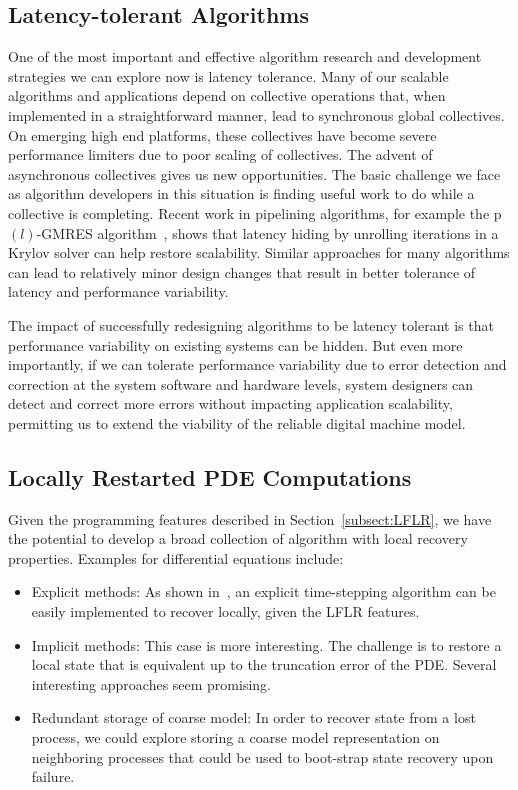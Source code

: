 \documentclass[10pt, twocolumn]{IEEEtran}
\begin{document}
\subsection{Latency-tolerant Algorithms}

One of the most important and effective algorithm research and development strategies we can explore now is latency tolerance.  Many of our scalable algorithms and applications depend on collective operations that, when implemented in a straightforward manner, lead to synchronous global collectives.  On emerging high end platforms, these collectives have become severe performance limiters due to poor scaling of collectives.  The advent of asynchronous collectives gives us new opportunities.  The basic challenge we face as algorithm developers in this situation is finding useful work to do while a collective is completing.  Recent work in pipelining algorithms, for example the p$(l)$-GMRES algorithm~\cite{ghysels2012hiding}, shows that latency hiding by unrolling iterations in a Krylov solver can help restore scalability.  Similar approaches for many algorithms can lead to relatively minor design changes that result in better tolerance of latency and performance variability.

The impact of successfully redesigning algorithms to be latency tolerant is that performance variability on existing systems can be hidden.  But even more importantly, if we can tolerate performance variability due to error detection and correction at the system software and hardware levels, system designers can detect and correct more errors without impacting application scalability, permitting us to extend the viability of the reliable digital machine model.

\subsection{Locally Restarted PDE Computations}

Given the programming features described in Section~\ref{subsect:LFLR}, we have the potential to develop a broad collection of algorithm with local recovery properties.  Examples for differential equations include:
\begin{itemize}
\item Explicit methods:  As shown in~\cite{GokhaleWong2011}, an explicit time-stepping algorithm can be easily implemented to recover locally, given the LFLR features.
\item Implicit methods:  This case is more interesting.  The challenge is to restore a local state that is equivalent up to the truncation error of the PDE.  Several interesting approaches seem promising. 
\item Redundant storage of coarse model:  In order to recover state from a lost process, we could explore storing a coarse model representation on neighboring processes that could be used to boot-strap state recovery upon failure.
\end{itemize}
\end{document}
